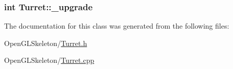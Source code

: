 \subsubsection[{\texorpdfstring{\+\_\+upgrade}{_upgrade}}]{\setlength{\rightskip}{0pt plus 5cm}int Turret\+::\+\_\+upgrade}\hypertarget{class_turret_a9af84b28b71291fd780c2959d331532d}{}\label{class_turret_a9af84b28b71291fd780c2959d331532d}


The documentation for this class was generated from the following files\+:\begin{DoxyCompactItemize}
\item 
Open\+G\+L\+Skeleton/\hyperlink{_turret_8h}{Turret.\+h}\item 
Open\+G\+L\+Skeleton/\hyperlink{_turret_8cpp}{Turret.\+cpp}\end{DoxyCompactItemize}
